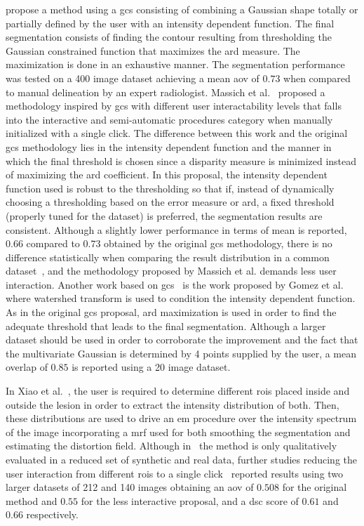\documentclass[authoryear,preprint,review,12pt]{elsarticle}
\begin{document}
\cite{Horsch:2001p6028} propose a method using a \ac{gcs} consisting of combining a Gaussian shape totally or partially defined by the user with an intensity dependent function. The final segmentation consists of finding the contour resulting from thresholding the Gaussian constrained function that maximizes the \ac{ard} measure. The maximization is done in an exhaustive manner. The segmentation performance was tested on a 400 image dataset achieving a mean \ac{aov} of $0.73$ when compared to manual delineation by an expert radiologist.  Massich et al.~\cite{massich2010lesion} proposed a methodology inspired by \ac{gcs} with different user interactability levels that falls into the interactive and semi-automatic procedures category when manually initialized with a single click. The difference between this work and the original \ac{gcs} methodology lies in the intensity dependent function and the manner in which the final threshold is chosen since a disparity measure is minimized instead of maximizing the \ac{ard} coefficient. In this proposal, the intensity dependent function used is robust to the thresholding so that if, instead of dynamically choosing a thresholding based on the error measure or \ac{ard}, a fixed threshold (properly tuned for the dataset) is preferred, the segmentation results are consistent. Although a slightly lower performance in terms of mean is reported, $0.66$ compared to $0.73$ obtained by the original \ac{gcs} methodology, there is no difference statistically when comparing the result distribution in a common dataset~\cite{massich2010lesion}, and the methodology proposed by Massich et al. demands less user interaction. 
Another work based on \ac{gcs}~\cite{Horsch:2001p6028} is the work proposed by Gomez et al.~\cite{Gomez:2010p14339} where watershed transform is used to condition the intensity dependent function. As in the original \ac{gcs} proposal, \ac{ard} maximization is used in order to find the adequate threshold that leads to the final segmentation. Although a larger dataset should be used in order to corroborate the improvement and the fact that the multivariate Gaussian is determined by 4 points supplied by the user, a mean overlap of $0.85$ is reported using a 20 image dataset. 

In Xiao et al.~\cite{Xiao:2002p5639}, the user is required to determine different \acp{roi} placed inside and outside the lesion in order to extract the intensity distribution of both. Then, these distributions are used to drive an \ac{em} procedure over the intensity spectrum of the image incorporating a \ac{mrf} used for both smoothing the segmentation and estimating the distortion field. Although in~\cite{Xiao:2002p5639} the method is only qualitatively evaluated in a reduced set of synthetic and real data, further studies reducing the user interaction from different \acp{roi} to a single click~\cite{gerard2013} reported results using two larger datasets of 212 and 140 images obtaining an \ac{aov} of $0.508$ for the original method and $0.55$ for the less interactive proposal, and a \ac{dsc} score of $0.61$ and $0.66$ respectively. 
\end{document}
